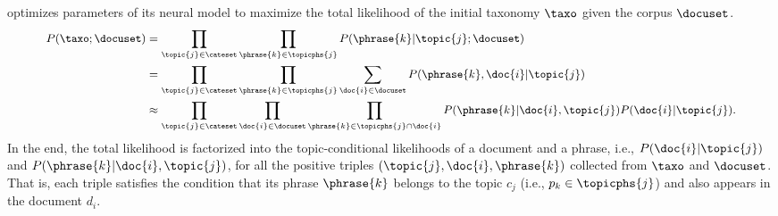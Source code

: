 \label{subsubsec:training}
\proposed optimizes parameters of its neural model to maximize the total likelihood of the initial taxonomy $\taxo$ given the corpus $\docuset$.
\begin{equation}
\small
\label{eq:likelihood}
    \begin{split}
        P(\taxo;\docuset) &= \prod_{\topic{j}\in\cateset} \prod_{\phrase{k}\in\topicphs{j}} P(\phrase{k}|\topic{j};\docuset) \\
        &= \prod_{\topic{j}\in\cateset} \prod_{\phrase{k}\in\topicphs{j}} \sum_{\doc{i}\in\docuset} P(\phrase{k}, \doc{i} |\topic{j}) \\
        &\approx \prod_{\topic{j}\in\cateset} \prod_{\doc{i}\in\docuset} \prod_{\phrase{k}\in\topicphs{j}\cap\doc{i}} P(\phrase{k}|\doc{i},\topic{j}) P(\doc{i}|\topic{j}).
    \end{split}
    \raisetag{49pt}
\end{equation}
In the end, the total likelihood is factorized into the topic-conditional likelihoods of a document and a phrase, i.e., $P(\doc{i}|\topic{j})$ and $P(\phrase{k}|\doc{i},\topic{j})$, for all the positive triples $(\topic{j}, \doc{i}, \phrase{k})$ collected from $\taxo$ and $\docuset$.
That is, each triple satisfies the condition that its phrase $\phrase{k}$ belongs to the topic $c_j$ (i.e., $p_k\in\topicphs{j}$) and also appears in the document $d_i$.

